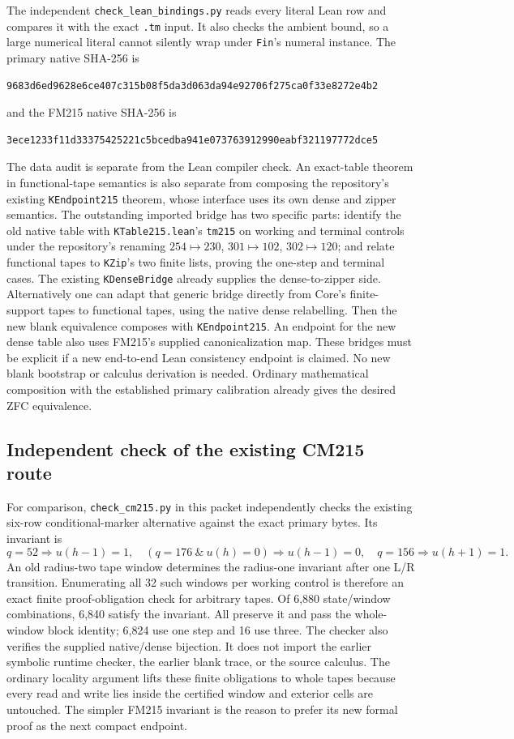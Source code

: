 The independent \texttt{check\_lean\_bindings.py} reads every literal Lean
row and compares it with the exact \texttt{.tm} input. It also checks the
ambient bound, so a large numerical literal cannot silently wrap under
\texttt{Fin}'s numeral instance. The primary native SHA-256 is
\begin{verbatim}
9683d6ed9628e6ce407c315b08f5da3d063da94e92706f275ca0f33e8272e4b2
\end{verbatim}
and the FM215 native SHA-256 is
\begin{verbatim}
3ece1233f11d33375425221c5bcedba941e073763912990eabf321197772dce5
\end{verbatim}
The data audit is separate from the Lean compiler check. An exact-table
theorem in functional-tape semantics is also separate from composing the
repository's existing \texttt{KEndpoint215} theorem, whose interface uses
its own dense and zipper semantics. The outstanding imported bridge has
two specific parts: identify the old native table with
\texttt{KTable215.lean}'s \texttt{tm215} on working and terminal controls
under the repository's renaming $254\mapsto230$, $301\mapsto102$,
$302\mapsto120$; and relate functional tapes to \texttt{KZip}'s two
finite lists, proving the one-step and terminal cases. The existing
\texttt{KDenseBridge} already supplies the dense-to-zipper side.
Alternatively one can adapt that generic bridge directly from Core's
finite-support tapes to functional tapes, using the native dense
relabelling. Then the new blank equivalence composes with
\texttt{KEndpoint215}. An endpoint for the new dense table also uses
FM215's supplied canonicalization map. These bridges must be explicit
if a new end-to-end Lean consistency endpoint is claimed. No new blank
bootstrap or calculus derivation is needed. Ordinary mathematical
composition with the established primary calibration already gives
the desired ZFC equivalence.

\subsection{Independent check of the existing CM215 route}

For comparison, \texttt{check\_cm215.py} in this packet independently checks
the existing six-row conditional-marker alternative against the exact
primary bytes. Its invariant is
\[
 q=52\Rightarrow u(h-1)=1,\quad
 (q=176\ \&\ u(h)=0)\Rightarrow u(h-1)=0,\quad
 q=156\Rightarrow u(h+1)=1.
\]
An old radius-two tape window determines the radius-one invariant after
one L/R transition. Enumerating all 32 such windows per working control
is therefore an exact finite proof-obligation check for arbitrary tapes.
Of 6,880 state/window combinations, 6,840 satisfy the invariant. All
preserve it and pass the whole-window block identity; 6,824 use one step
and 16 use three. The checker also verifies the supplied native/dense
bijection. It does not import the earlier symbolic runtime checker,
the earlier blank trace, or the source calculus. The ordinary locality
argument lifts these finite obligations to whole tapes because every
read and write lies inside the certified window and exterior cells are
untouched. The simpler FM215 invariant is the reason to prefer its new
formal proof as the next compact endpoint.
